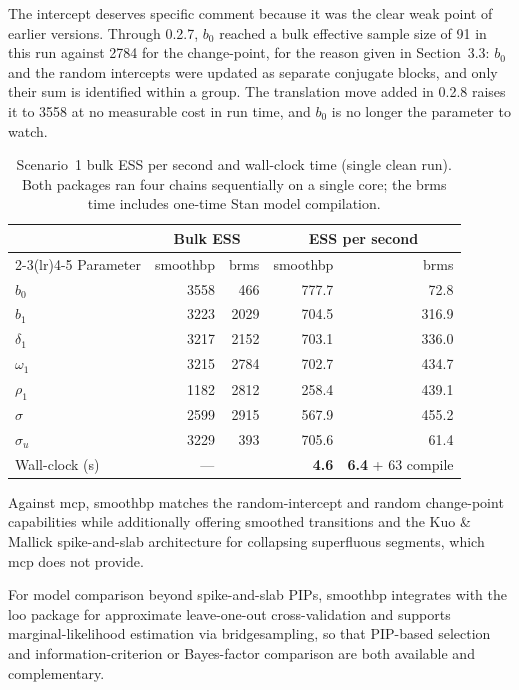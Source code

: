 \documentclass[12pt]{article}
\newcommand{\pkg}[1]{\textsf{#1}}
\begin{document}
The intercept deserves specific comment because it was the clear weak point of earlier versions. Through 0.2.7, $b_0$ reached a bulk effective sample size of 91 in this run against 2784 for the change-point, for the reason given in Section~3.3: $b_0$ and the random intercepts were updated as separate conjugate blocks, and only their sum is identified within a group. The translation move added in 0.2.8 raises it to 3558 at no measurable cost in run time, and $b_0$ is no longer the parameter to watch.

\begin{table}[t]
\centering
\caption{Scenario~1 bulk ESS per second and wall-clock time (single clean run). Both packages ran four chains sequentially on a single core; the \pkg{brms} time includes one-time Stan model compilation.}
\label{tab:ess}
\begin{tabular}{lrrrr}
\toprule
& \multicolumn{2}{c}{Bulk ESS} & \multicolumn{2}{c}{ESS per second} \\
\cmidrule(lr){2-3}\cmidrule(lr){4-5}
Parameter & \pkg{smoothbp} & \pkg{brms} & \pkg{smoothbp} & \pkg{brms} \\
\midrule
$b_0$        & 3558 &  466 &  777.7 &   72.8 \\
$b_1$        & 3223 & 2029 &  704.5 &  316.9 \\
$\delta_1$   & 3217 & 2152 &  703.1 &  336.0 \\
$\omega_1$   & 3215 & 2784 &  702.7 &  434.7 \\
$\rho_1$     & 1182 & 2812 &  258.4 &  439.1 \\
$\sigma$     & 2599 & 2915 &  567.9 &  455.2 \\
$\sigma_u$   & 3229 &  393 &  705.6 &   61.4 \\
\midrule
Wall-clock (s) & \multicolumn{2}{c}{---} & \textbf{4.6} & \textbf{6.4} + 63 compile \\
\bottomrule
\end{tabular}
\end{table}

Against \pkg{mcp}, \pkg{smoothbp} matches the random-intercept and random change-point capabilities while additionally offering smoothed transitions and the Kuo \& Mallick spike-and-slab architecture for collapsing superfluous segments, which \pkg{mcp} does not provide.

For model comparison beyond spike-and-slab PIPs, \pkg{smoothbp} integrates with the \pkg{loo} package for approximate leave-one-out cross-validation and supports marginal-likelihood estimation via \pkg{bridgesampling}, so that PIP-based selection and information-criterion or Bayes-factor comparison are both available and complementary.
\end{document}
